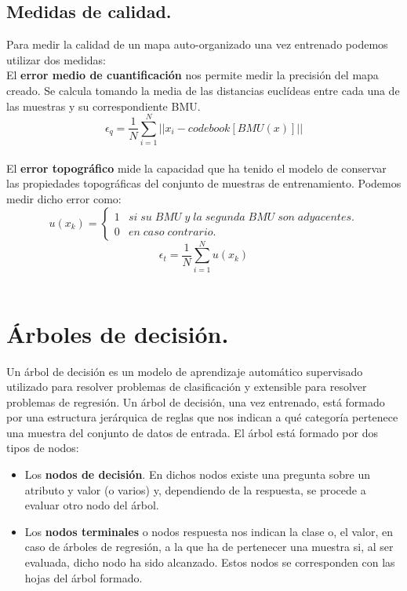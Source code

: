 \subsection{Medidas de calidad.}
Para medir la calidad de un mapa auto-organizado una vez entrenado podemos utilizar dos medidas:\\

El \textbf{error medio de cuantificación} nos permite medir la precisión del mapa creado. Se calcula tomando la media de las distancias euclídeas entre cada una de las muestras y su correspondiente BMU.\\

$$
\epsilon_q = \frac{1}{N}\sum_{i=1}^{N}  || x_i - codebook[BMU(x)] ||
$$\\

El \textbf{error topográfico} mide la capacidad que ha tenido el modelo de conservar las propiedades topográficas del conjunto de muestras de entrenamiento. Podemos medir dicho error como:\\
$$
u(x_k) = \left\{
\begin{array}{ll}
1 & si \; su \; BMU \; y \; la \; segunda \; BMU \; son \; adyacentes.\\
0 & en \; caso \; contrario.
\end{array}
\right.
$$
$$
\epsilon_t =  \frac{1}{N}\sum_{i=1}^{N} u(x_k)
$$\\

\section{Árboles de decisión.}
Un árbol de decisión \cite{arbol} es un modelo de aprendizaje automático supervisado utilizado para resolver problemas de clasificación y extensible para resolver problemas de regresión. Un árbol de decisión, una vez entrenado, está formado por una estructura jerárquica de reglas que nos indican a qué categoría pertenece una muestra del conjunto de datos de entrada. El árbol está formado por dos tipos de nodos:\\

\begin{itemize}
	\item Los \textbf{nodos de decisión}. En dichos nodos existe una pregunta sobre un atributo y valor (o varios) y, dependiendo de la respuesta, se procede a evaluar otro nodo del árbol.
	\item Los \textbf{nodos terminales} o nodos respuesta nos indican la clase o, el valor, en caso de árboles de regresión, a la que ha de pertenecer una muestra si, al ser evaluada, dicho nodo ha sido alcanzado. Estos nodos se corresponden con las hojas del árbol formado.
\end{itemize}


